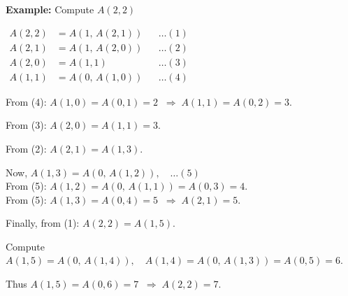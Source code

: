 \vspace{1em}
\textbf{Example:} Compute $A(2,2)$

\vspace{1em}
\(
\begin{aligned}
A(2,2) &= A(1,\,A(2,1)) && \ldots{(1)} \\
A(2,1) &= A(1,\,A(2,0)) && \ldots{(2)} \\
A(2,0) &= A(1,1)        && \ldots{(3)} \\
A(1,1) &= A(0,\,A(1,0)) && \ldots{(4)}
\end{aligned}
\)

From (4): $A(1,0) = A(0,1) = 2 \;\;\Rightarrow\; A(1,1) = A(0,2) = 3.$

From (3): $A(2,0) = A(1,1) = 3.$

From (2): $A(2,1) = A(1,3).$

Now, $A(1,3) = A(0,\,A(1,2)), \quad \ldots{(5)}$\\[0.5em]
From (5): $A(1,2) = A(0,\,A(1,1)) = A(0,3) = 4.$\\[0.5em]
From (5): $A(1,3) = A(0,4) = 5 \;\;\Rightarrow\; A(2,1) = 5.$

Finally, from (1): $A(2,2) = A(1,5).$

Compute $A(1,5) = A(0,\,A(1,4)), \quad A(1,4) = A(0,\,A(1,3)) = A(0,5) = 6.$

Thus $A(1,5) = A(0,6) = 7 \;\;\Rightarrow\; \boxed{A(2,2) = 7}.$